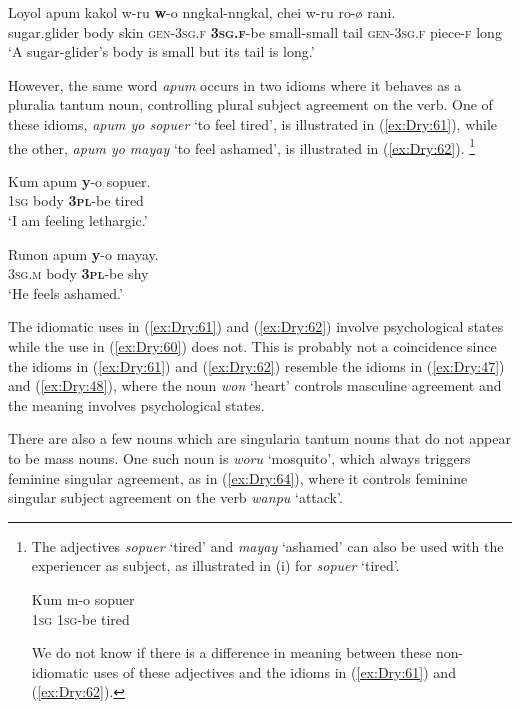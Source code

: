 \documentclass[output=collectionpaper]{langsci/langscibook}
\begin{document}
\ea \label{ex:Dry:60}
\gll Loyol	apum	kakol	w-ru	\textbf{w}-o nngkal-nngkal,	chei	w-ru	ro-ø	rani.\\
sugar.glider body skin \textsc{gen}-\textsc{3sg.f} \textbf{\textsc{3sg.f}}-be small-small tail \textsc{gen}-\textsc{3sg.f} piece-\textsc{f} long\\
\glt `A sugar-glider's body is small but its tail is long.'
\z

However, the same word \textit{apum} occurs in two idioms where it behaves as a pluralia tantum noun, controlling plural subject agreement on the verb. One of these idioms, \textit{apum yo sopuer} `to feel tired', is illustrated in (\ref{ex:Dry:61}), while the other, \textit{apum yo mayay} `to feel ashamed', is illustrated in (\ref{ex:Dry:62}).%
\footnote{The adjectives \textit{sopuer} `tired' and \textit{mayay} `ashamed' can also be used with the experiencer as subject, as illustrated in (i) for \textit{sopuer} `tired'.

\begin{exe}
  \let\eachwordtwo=\footnotesize
{}
{
\gll Kum	m-o	sopuer\\
\textsc{1sg} \textsc{1sg}-be tired\\
}
\end{exe}

\noindent We do not know if there is a difference in meaning between these non-idiomatic uses of these adjectives and the idioms in (\ref{ex:Dry:61}) and (\ref{ex:Dry:62}).}

\ea \label{ex:Dry:61}
\gll Kum	apum	\textbf{y}-o	sopuer.\\
\textsc{1sg} body \textbf{\textsc{3pl}}-be tired\\
\glt  `I am feeling lethargic.'
\z

\ea \label{ex:Dry:62}
\gll Runon	apum	\textbf{y}-o	mayay.\\
\textsc{3sg.m} body \textbf{\textsc{3pl}}-be shy\\
\glt  `He feels ashamed.'
\z

The idiomatic uses in (\ref{ex:Dry:61}) and (\ref{ex:Dry:62}) involve psychological states while the use in (\ref{ex:Dry:60}) does not. This is probably not a coincidence since the idioms in (\ref{ex:Dry:61}) and (\ref{ex:Dry:62}) resemble the idioms in (\ref{ex:Dry:47}) and (\ref{ex:Dry:48}), where the noun \textit{won} `heart' controls masculine agreement and the meaning involves psychological states.

There are also a few nouns which are singularia tantum nouns that do not appear to be mass nouns. One such noun is \textit{woru} `mosquito', which always triggers feminine singular agreement, as in (\ref{ex:Dry:64}), where it controls feminine singular subject agreement on the verb \textit{wanpu} `attack'.
\end{document}
